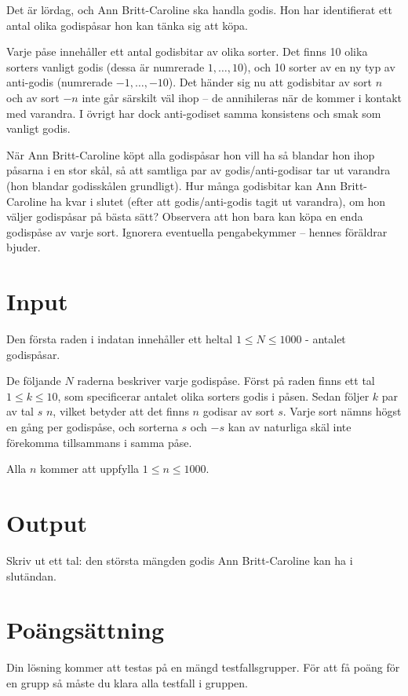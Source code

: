 Det är lördag, och Ann Britt-Caroline ska handla godis. Hon har identifierat ett antal olika godispåsar hon kan tänka sig att köpa.

Varje påse innehåller ett antal godisbitar av olika sorter. Det finns 10 olika sorters vanligt godis (dessa är numrerade $1, \ldots, 10$), och 10 sorter av en ny typ av anti-godis (numrerade $-1, \ldots, -10$). Det händer sig nu att godisbitar av sort $n$ och av sort $-n$ inte går särskilt väl ihop -- de annihileras när de kommer i kontakt med varandra. I övrigt har dock anti-godiset samma konsistens och smak som vanligt godis.

När Ann Britt-Caroline köpt alla godispåsar hon vill ha så blandar hon ihop påsarna i en stor skål, så att samtliga par av godis/anti-godisar tar ut varandra (hon blandar godisskålen grundligt). Hur många godisbitar kan Ann Britt-Caroline ha kvar i slutet (efter att godis/anti-godis tagit ut varandra), om hon väljer godispåsar på bästa sätt? Observera att hon bara kan köpa en enda godispåse av varje sort. Ignorera eventuella pengabekymmer -- hennes föräldrar bjuder.

\section*{Input}
Den första raden i indatan innehåller ett heltal $1 \le N \le 1000$ - antalet godispåsar.

De följande $N$ raderna beskriver varje godispåse.
Först på raden finns ett tal $1 \le k \le 10$, som specificerar antalet olika sorters godis i påsen.
Sedan följer $k$ par av tal $s$ $n$, vilket betyder att det finns $n$ godisar av sort $s$.
Varje sort nämns högst en gång per godispåse, och sorterna $s$ och $-s$ kan av naturliga skäl inte förekomma tillsammans i samma påse.

Alla $n$ kommer att uppfylla $1 \le n \le 1000$.

\section*{Output}
Skriv ut ett tal: den största mängden godis Ann Britt-Caroline kan ha i slutändan.

\section*{Poängsättning}
Din lösning kommer att testas på en mängd testfallsgrupper. För att få poäng för en grupp så måste du klara alla testfall i gruppen.

